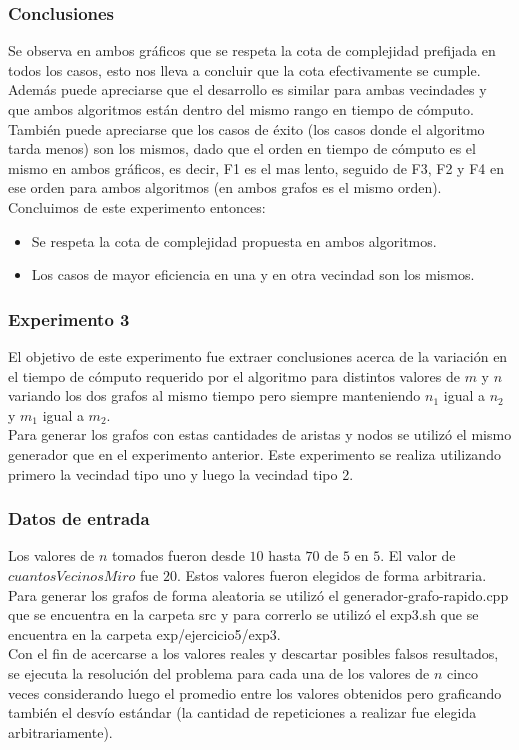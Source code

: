 \subsubsection*{Conclusiones}\;
 Se observa en ambos gráficos que se respeta la cota de complejidad prefijada en todos los casos, esto nos lleva a concluir que la cota efectivamente se cumple.\\
 Además puede apreciarse que el desarrollo es similar para ambas vecindades y que ambos algoritmos están dentro del mismo rango en tiempo de cómputo.\\
 También puede apreciarse que los casos de éxito (los casos donde el algoritmo tarda menos) son los mismos, dado que el orden en tiempo de cómputo es el mismo en ambos gráficos, es decir, F1 es el mas lento, seguido de F3, F2 y F4 en ese orden para ambos algoritmos (en ambos grafos es el mismo orden).\\
 Concluimos de este experimento entonces:\\
 \begin{itemize}
\item Se respeta la cota de complejidad propuesta en ambos algoritmos.
\item Los casos de mayor eficiencia en una y en otra vecindad son los mismos.
\end{itemize}
\subsubsection*{Experimento 3}\; 
    El objetivo de este experimento fue extraer conclusiones acerca de la variación en el tiempo de cómputo requerido por el algoritmo para distintos valores de $m$ y $n$ variando los dos grafos al mismo tiempo pero siempre manteniendo $n_1$ igual a $n_2$ y $m_1$ igual a $m_2$. \\
Para generar los grafos con estas cantidades de aristas y nodos se utilizó el mismo generador que en el experimento anterior. 
Este experimento se realiza utilizando primero la vecindad tipo uno y luego la vecindad tipo 2.
        
\subsubsection*{Datos de entrada}\;
    \noindent Los valores de $n$ tomados fueron desde $10$ hasta $70$ de $5$ en $5$. El valor de $cuantosVecinosMiro$ fue $20$. Estos valores fueron elegidos de forma arbitraria. \\
        Para generar los grafos de forma aleatoria se utilizó el generador-grafo-rapido.cpp que se encuentra en la carpeta src y para correrlo se utilizó el exp3.sh que se encuentra en la carpeta exp/ejercicio5/exp3. \\
        Con el fin de acercarse a los valores reales y descartar posibles falsos resultados, se ejecuta la resolución del problema para cada una de los valores de $n$ cinco veces considerando luego el promedio entre los valores obtenidos pero graficando también el desvío estándar (la cantidad de repeticiones a realizar fue elegida arbitrariamente).\; 
